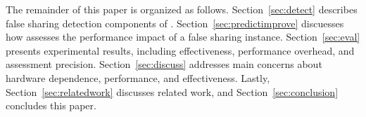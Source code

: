 The remainder of this paper is organized as follows. 
Section~\ref{sec:detect} describes false sharing detection components of \Cheetah{}. Section~\ref{sec:predictimprove} discuesses how \cheetah{} assesses the performance impact of a false sharing instance. Section~\ref{sec:eval} presents experimental results, including effectiveness, performance overhead, and assessment precision. Section~\ref{sec:discuss} addresses main concerns about hardware dependence, performance, and effectiveness. Lastly, Section~\ref{sec:relatedwork} discusses related work, and Section~\ref{sec:conclusion} concludes this paper. 




